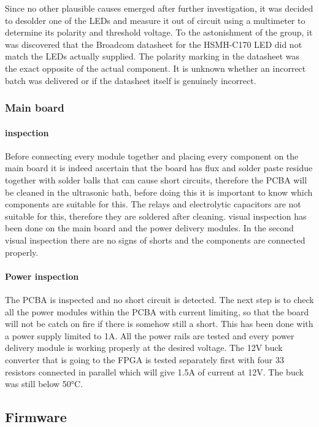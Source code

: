 Since no other plausible causes emerged after further investigation, it was decided to desolder one of the LEDs and measure it out of circuit using a multimeter to determine its polarity and threshold voltage. To the astonishment of the group, it was discovered that the Broadcom datasheet for the HSMH-C170 LED did not match the LEDs actually supplied. The polarity marking in the datasheet was the exact opposite of the actual component. It is unknown whether an incorrect batch was delivered or if the datasheet itself is genuinely incorrect.

\subsubsection{Main board}
\paragraph{inspection} Before connecting every module together and placing every component on the main board it is indeed ascertain that the board has flux and solder paste residue together with solder balls that can cause short circuits, therefore the PCBA will be cleaned in the ultrasonic bath, before doing this it is important to know which components are suitable for this. The relays and electrolytic capacitors are not suitable for this, therefore they are soldered after cleaning.  visual inspection has been done on the main board and the power delivery modules. In the second visual inspection there are no signs of shorts and the components are connected properly.

\paragraph{Power inspection}

The PCBA is inspected and no short circuit is detected. The next step is to check all the power modules within the PCBA with current limiting, so that the board will not be catch on fire if there is somehow still a short. This has been done with a power supply limited to 1A. All the power rails are tested and every power delivery module is working properly at the desired voltage. The 12V buck converter that is going to the FPGA is tested separately first with four 33 resistors connected in parallel which will give 1.5A of current at 12V. The buck was still below 50°C. 

\subsection{Firmware}
